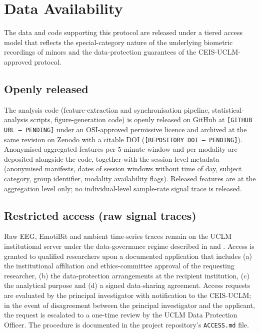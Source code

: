 
\section*{Data Availability}\label{sec:data-availability}

The data and code supporting this protocol are released under a tiered access model that reflects the special-category nature of the underlying biometric recordings of minors and the data-protection guarantees of the CEIS-UCLM-approved protocol.

\subsection*{Openly released}

The analysis code (feature-extraction and synchronisation pipeline, statistical-analysis scripts, figure-generation code) is openly released on GitHub at \texttt{[GITHUB URL --- PENDING]} under an OSI-approved permissive licence and archived at the same revision on Zenodo with a citable DOI (\texttt{[REPOSITORY DOI --- PENDING]}). Anonymised aggregated features per 5-minute window and per modality are deposited alongside the code, together with the session-level metadata (anonymised manifests, dates of session windows without time of day, subject category, group identifier, modality availability flags). Released features are at the aggregation level only; no individual-level sample-rate signal trace is released.

\subsection*{Restricted access (raw signal traces)}

Raw EEG, EmotiBit and ambient time-series traces remain on the UCLM institutional server under the data-governance regime described in  and . Access is granted to qualified researchers upon a documented application that includes (a) the institutional affiliation and ethics-committee approval of the requesting researcher, (b) the data-protection arrangements at the recipient institution, (c) the analytical purpose and (d) a signed data-sharing agreement. Access requests are evaluated by the principal investigator with notification to the CEIS-UCLM; in the event of disagreement between the principal investigator and the applicant, the request is escalated to a one-time review by the UCLM Data Protection Officer. The procedure is documented in the project repository's \texttt{ACCESS.md} file.

